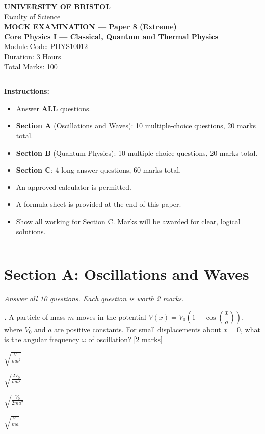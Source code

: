 \documentclass[12pt,a4paper]{article}
\newcounter{mcqcounter}
\newcommand{\mcq}[1]{%
  \stepcounter{mcqcounter}%
  \vspace{0.3cm}%
  \noindent\textbf{\themcqcounter.} #1 \hfill [2 marks]%
  \vspace{0.1cm}%
}
\begin{document}
\begin{center}
{\Large\textbf{UNIVERSITY OF BRISTOL}}\\[0.3cm]
{\large Faculty of Science}\\[0.5cm]
{\Large\textbf{MOCK EXAMINATION --- Paper 8 (Extreme)}}\\[0.3cm]
{\large\textbf{Core Physics I --- Classical, Quantum and Thermal Physics}}\\[0.2cm]
{\large Module Code: PHYS10012}\\[0.5cm]
{\large Duration: 3 Hours}\\[0.3cm]
{\large Total Marks: 100}\\[0.5cm]
\end{center}

\noindent\rule{\textwidth}{0.4pt}

\vspace{0.3cm}
\noindent\textbf{Instructions:}
\begin{itemize}[itemsep=0.1cm]
\item Answer \textbf{ALL} questions.
\item \textbf{Section A} (Oscillations and Waves): 10 multiple-choice questions, 20 marks total.
\item \textbf{Section B} (Quantum Physics): 10 multiple-choice questions, 20 marks total.
\item \textbf{Section C}: 4 long-answer questions, 60 marks total.
\item An approved calculator is permitted.
\item A formula sheet is provided at the end of this paper.
\item Show all working for Section C. Marks will be awarded for clear, logical solutions.
\end{itemize}

\noindent\rule{\textwidth}{0.4pt}
\newpage

\section*{Section A: Oscillations and Waves}
\noindent\textit{Answer all 10 questions. Each question is worth 2 marks.}\\[0.3cm]

\setcounter{mcqcounter}{0}

\mcq{A particle of mass $m$ moves in the potential $V(x) = V_0\!\left(1 - \cos\!\left(\dfrac{x}{a}\right)\right)$, where $V_0$ and $a$ are positive constants. For small displacements about $x = 0$, what is the angular frequency $\omega$ of oscillation?}
\begin{choices}
\item $\displaystyle\sqrt{\frac{V_0}{ma^2}}$
\item $\displaystyle\sqrt{\frac{2V_0}{ma^2}}$
\item $\displaystyle\sqrt{\frac{V_0}{2ma^2}}$
\item $\displaystyle\sqrt{\frac{V_0}{ma}}$
\end{choices}
\end{document}
